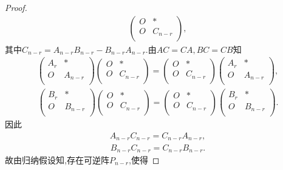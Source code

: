 \documentclass[../../main.tex]{subfiles}%
\begin{document}
\begin{proof}
\begin{align*}
\begin{pmatrix}
O&		*\\
O&		C_{n-r}\\
\end{pmatrix},
\end{align*}
其中$C_{n-r}=A_{n-r}B_{n-r}-B_{n-r}A_{n-r}$.由$AC=CA,BC=CB$知
\begin{align*}
\begin{pmatrix}
A_r&		*\\
O&		A_{n-r}\\
\end{pmatrix} \begin{pmatrix}
O&		*\\
O&		C_{n-r}\\
\end{pmatrix} =\begin{pmatrix}
O&		*\\
O&		C_{n-r}\\
\end{pmatrix} \begin{pmatrix}
A_r&		*\\
O&		A_{n-r}\\
\end{pmatrix},
\end{align*}
\begin{align*}
\begin{pmatrix}
B_r&		*\\
O&		B_{n-r}\\
\end{pmatrix} \begin{pmatrix}
O&		*\\
O&		C_{n-r}\\
\end{pmatrix} =\begin{pmatrix}
O&		*\\
O&		C_{n-r}\\
\end{pmatrix} \begin{pmatrix}
B_r&		*\\
O&		B_{n-r}\\
\end{pmatrix}.
\end{align*}
因此
\begin{align*}
A_{n-r}C_{n-r}=C_{n-r}A_{n-r},
\end{align*}
\begin{align*}
B_{n-r}C_{n-r}=C_{n-r}B_{n-r}.
\end{align*}
故由归纳假设知,存在可逆阵$P_{n-r}$,使得

\end{proof}
\end{document}
